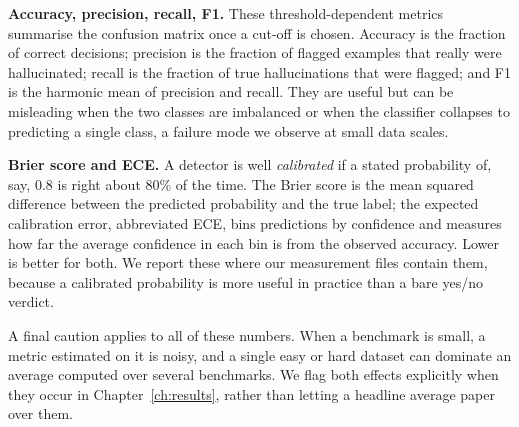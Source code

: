 \textbf{Accuracy, precision, recall, F1.} These threshold-dependent metrics summarise
the confusion matrix once a cut-off is chosen. Accuracy is the fraction of correct
decisions; precision is the fraction of flagged examples that really were hallucinated;
recall is the fraction of true hallucinations that were flagged; and F1 is the harmonic
mean of precision and recall. They are useful but can be misleading when the two classes
are imbalanced or when the classifier collapses to predicting a single class, a failure
mode we observe at small data scales.

\textbf{Brier score and ECE.} A detector is well \emph{calibrated} if a stated
probability of, say, $0.8$ is right about $80\%$ of the time. The Brier score is the
mean squared difference between the predicted probability and the true label; the
expected calibration error, abbreviated ECE, bins predictions by confidence and measures
how far the average confidence in each bin is from the observed accuracy. Lower is better
for both. We report these where our measurement files contain them, because a calibrated
probability is more useful in practice than a bare yes/no verdict.

A final caution applies to all of these numbers. When a benchmark is small, a metric
estimated on it is noisy, and a single easy or hard dataset can dominate an average
computed over several benchmarks. We flag both effects explicitly when they occur in
Chapter~\ref{ch:results}, rather than letting a headline average paper over them.
